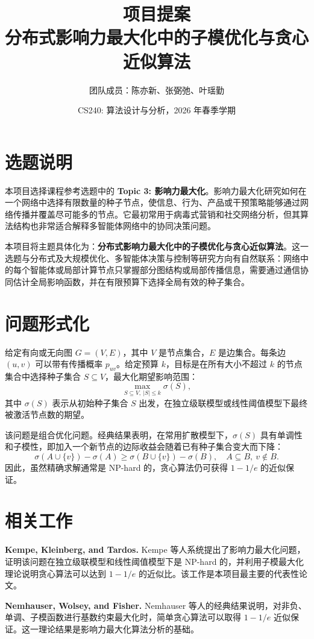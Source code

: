 \documentclass[UTF8, 11pt]{ctexart}
\title{\textbf{项目提案}\\
分布式影响力最大化中的子模优化与贪心近似算法}
\author{团队成员：陈亦新、张弼弛、叶瑶勤}
\date{CS240: 算法设计与分析，2026 年春季学期}
\begin{document}
\maketitle

\section{选题说明}

本项目选择课程参考选题中的 \textbf{Topic 3: 影响力最大化}。影响力最大化研究如何在一个网络中选择有限数量的种子节点，使信息、行为、产品或干预策略能够通过网络传播并覆盖尽可能多的节点。它最初常用于病毒式营销和社交网络分析，但其算法结构也非常适合解释多智能体网络中的协同决策问题。

本项目将主题具体化为：\textbf{分布式影响力最大化中的子模优化与贪心近似算法}。这一选题与分布式及大规模优化、多智能体决策与控制等研究方向有自然联系：网络中的每个智能体或局部计算节点只掌握部分图结构或局部传播信息，需要通过通信协同估计全局影响函数，并在有限预算下选择全局有效的种子集合。

\section{问题形式化}

给定有向或无向图 $G=(V,E)$，其中 $V$ 是节点集合，$E$ 是边集合。每条边 $(u,v)$ 可以带有传播概率 $p_{uv}$。给定预算 $k$，目标是在所有大小不超过 $k$ 的节点集合中选择种子集合 $S\subseteq V$，最大化期望影响范围：
\[
    \max_{S\subseteq V,\ |S|\leq k} \sigma(S),
\]
其中 $\sigma(S)$ 表示从初始种子集合 $S$ 出发，在独立级联模型或线性阈值模型下最终被激活节点数的期望。

该问题是组合优化问题。经典结果表明，在常用扩散模型下，$\sigma(S)$ 具有单调性和子模性，即加入一个新节点的边际收益会随着已有种子集合变大而下降：
\[
    \sigma(A\cup\{v\})-\sigma(A)
    \geq
    \sigma(B\cup\{v\})-\sigma(B),
    \quad A\subseteq B,\ v\notin B.
\]
因此，虽然精确求解通常是 NP-hard 的，贪心算法仍可获得 $1-1/e$ 的近似保证。

\section{相关工作}

\textbf{Kempe, Kleinberg, and Tardos.}
Kempe 等人系统提出了影响力最大化问题，证明该问题在独立级联模型和线性阈值模型下是 NP-hard 的，并利用子模最大化理论说明贪心算法可以达到 $1-1/e$ 的近似比。该工作是本项目最主要的代表性论文。

\textbf{Nemhauser, Wolsey, and Fisher.}
Nemhauser 等人的经典结果说明，对非负、单调、子模函数进行基数约束最大化时，简单贪心算法可以取得 $1-1/e$ 近似保证。这一理论结果是影响力最大化算法分析的基础。
\end{document}
